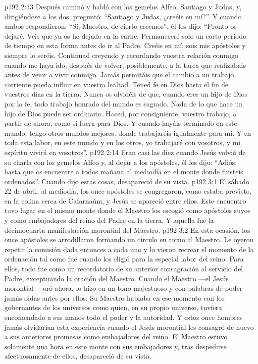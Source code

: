 \vs p192 2:13 \pc Después caminó y habló con los gemelos Alfeo, Santiago y Judas, y, dirigiéndose a los dos, preguntó: “Santiago y Judas, ¿creéis en mí?”. Y cuando ambos respondieron: “Sí, Maestro, de cierto creemos”, él les dijo: “Pronto os dejaré. Veis que ya os he dejado en la carne. Permaneceré solo un corto período de tiempo en esta forma antes de ir al Padre. Creéis en mí; sois mis apóstoles y siempre lo seréis. Continuad creyendo y recordando vuestra relación conmigo cuando me haya ido, después de volver, posiblemente, a la tarea que realizabais antes de venir a vivir conmigo. Jamás permitáis que el cambio a un trabajo corriente pueda influir en vuestra lealtad. Tened fe en Dios hasta el fin de vuestros días en la tierra. Nunca os olvidéis de que, cuando eres un hijo de Dios por la fe, todo trabajo honrado del mundo es sagrado. Nada de lo que hace un hijo de Dios puede ser ordinario. Haced, por consiguiente, vuestro trabajo, a partir de ahora, como si fuera para Dios. Y cuando hayáis terminado en este mundo, tengo otros mundos mejores, donde trabajaréis igualmente para mí. Y en toda esta labor, en este mundo y en los otros, yo trabajaré con vosotros, y mi espíritu vivirá en vosotros”.
\vs p192 2:14 \pc Eran casi las diez cuando Jesús volvió de su charla con los gemelos Alfeo y, al dejar a los apóstoles, él les dijo: “Adiós, hasta que os encuentre a todos mañana al mediodía en el monte donde fuisteis ordenados”. Cuando dijo estas cosas, desapareció de su vista.
\vs p192 3:1 El sábado 22 de abril, al mediodía, los once apóstoles se congregaron, como estaba previsto, en la colina cerca de Cafarnaúm, y Jesús se apareció entre ellos. Este encuentro tuvo lugar en el mismo monte donde el Maestro los escogió como apóstoles suyos y como embajadores del reino del Padre en la tierra. Y aquella fue la decimocuarta manifestación morontial del Maestro.
\vs p192 3:2 En esta ocasión, los once apóstoles se arrodillaron formando un círculo en torno al Maestro. Le oyeron repetir la comisión dada entonces a cada uno y lo vieron recrear el momento de la ordenación tal como fue cuando los eligió para la especial labor del reino. Para ellos, todo fue como un recordatorio de su anterior consagración al servicio del Padre, exceptuando la oración del Maestro. Cuando el Maestro ---el Jesús morontial--- oró ahora, lo hizo en un tono majestuoso y con palabras de poder jamás oídas antes por ellos. Su Maestro hablaba en ese momento con los gobernantes de los universos como quien, en su propio universo, tuviera encomendado a sus manos todo el poder y la autoridad. Y estos once hombres jamás olvidarían esta experiencia cuando el Jesús morontial les consagró de nuevo a sus anteriores promesas como embajadores del reino. El Maestro estuvo solamente una hora en este monte con sus embajadores y, tras despedirse afectuosamente de ellos, desapareció de su vista.
